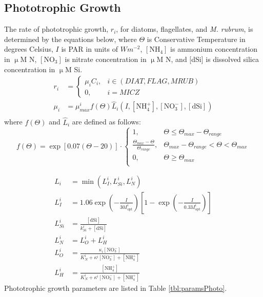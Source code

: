 \documentclass[draft,jgrga]{agutexSI2019}
\begin{document}
\begin{article}
\subsection*{Phototrophic Growth}
The rate of phototrophic growth, $r_i$, for diatoms, flagellates, and \textit{M. rubrum}, is determined by the equations below, 
where $\Theta$ is Conservative Temperature in degrees Celsius, 
$I$ is PAR in units of $W m^{-2}$,
$\mathrm{[NH_4]}$ is ammonium concentration in $\upmu$M N, 
$\mathrm{[NO_3]}$ is nitrate concentration in $\upmu$M N, and 
[dSi] is dissolved silica concentration in $\upmu$M Si.
\begin{align}
\label{eq:r}
  r_i &=\begin{cases}
  		\mu_iC_i, & i \in (DIAT, FLAG, MRUB) \\
		0, & i=MICZ 
  	 \end{cases}\\
  \mu_i &=\mu^i_{max}f(\Theta)\hat{L}_i(I,\mathrm{[NH_4^+]},\mathrm{[NO_3^-]},\mathrm{[dSi]}) \\
\end{align}
where $f(\Theta)$ and $\hat{L}_i$ are defined as follows:
\begin{equation}
\label{eq:Tdep}
  f(\Theta) = \exp\left[0.07(\Theta-20)\right]\cdot
       \begin{cases}
         1, 				         & \Theta \leq \Theta_{max}-\Theta_{range} \\
    	\frac{\Theta_{max}-\Theta}{\Theta_{range}},      & \Theta_{max}-\Theta_{range}<\Theta<\Theta_{max}\\ 
    	0,      			                   & \Theta \geq \Theta_{max}\\
        \end{cases} 
\end{equation}

\begin{align}
   \hat{L}_i&=\min(L_I^i,L_{Si}^i,L_N^i) \\
   L_I^i&=1.06\exp\left(-\frac{I}{30I_{\text{opt}}^i}\right)\left[1 - \exp\left(-\frac{I}{0.33I_{\text{opt}}^i}\right)\right] \\
   L_{Si}^i &=\frac{[\text{dSi}]}{k_{Si}^i + [\text{dSi}]} \\
   L_N^i &=L_O^i+L_H^i \\
   L_O^i &=\frac{\kappa_i[\text{NO}_{3}^{-}]}{K_N^i + \kappa^i[\text{NO}_{3}^{-}] + [\text{NH}_{4}^{+}]} \\
   L_H^i &=\frac{[\text{NH}_{4}^{+}]}{K_N^i + \kappa^i[\text{NO}_{3}^{-}] + [\text{NH}_{4}^{+}]} 
\end{align} 
Phototrophic growth parameters are listed in Table \ref{tbl:paramsPhoto}.


\end{article}
\end{document}
